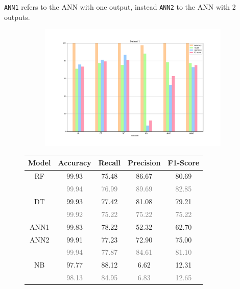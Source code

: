 \documentclass{Configuration_Files/PoliMi3i_thesis}
\begin{document}
\verb|ANN1| refers to the ANN with one output, instead \verb|ANN2| to the ANN with 2 outputs.
\begin{figure}[H]
\centering
\begin{subfigure}
    \centering
    \includegraphics[scale=0.3]{Images/Dataset_1.png}
\end{subfigure}
\renewcommand{\arraystretch}{0.8}%
\begin{table}[H]
\centering 
    \begin{tabular}{ c  c  c  c  c }
    \hline 
    \textbf{Model}  & \textbf{Accuracy} & \textbf{Recall} & \textbf{Precision} & \textbf{F1-Score} \\
    \hline
    RF	& 99.93	& 75.48	& 86.67 & 80.69 \\
        & \footnotesize\textcolor{gray}{99.94} & \footnotesize\textcolor{gray}{76.99} & \footnotesize\textcolor{gray}{89.69} & \footnotesize\textcolor{gray}{82.85} \\[0.01cm]
    DT	& 99.93	& 77.42	& 81.08 & 79.21 \\
        & \footnotesize\textcolor{gray}{99.92} & \footnotesize\textcolor{gray}{75.22} & \footnotesize\textcolor{gray}{75.22} & \footnotesize\textcolor{gray}{75.22} \\
    ANN1 & 99.83 & 78.22 & 52.32 & 62.70 \\
    ANN2 & 99.91 & 77.23 & 72.90 & 75.00 \\
         & \footnotesize\textcolor{gray}{99.94} & \footnotesize\textcolor{gray}{77.87} & \footnotesize\textcolor{gray}{84.61} & \footnotesize\textcolor{gray}{81.10} \\
    NB	& 97.77	& 88.12	& 6.62 & 12.31 \\
        & \footnotesize\textcolor{gray}{98.13} & \footnotesize\textcolor{gray}{84.95} & \footnotesize\textcolor{gray}{6.83} & \footnotesize\textcolor{gray}{12.65} \\

\end{tabular}
\end{table}
\end{figure}
\end{document}
